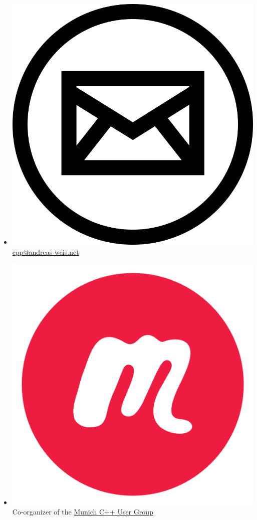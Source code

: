 \documentclass[aspectratio=169]{beamer}
\begin{document}
\begin{frame}[fragile]
\begin{itemize}
    \item \href{mailto:cpp@andreas-weis.net}{\includegraphics[height=.06\textheight]{resources/email-icon.png} cpp@andreas-weis.net}

    \item \href{https://www.meetup.com/MUCplusplus/}{\includegraphics[height=.05\textheight]{resources/meetup-icon.png}} Co-organizer of the \href{https://www.meetup.com/MUCplusplus/}{Munich C++ User Group}
  \end{itemize}
\end{frame}
\end{document}

